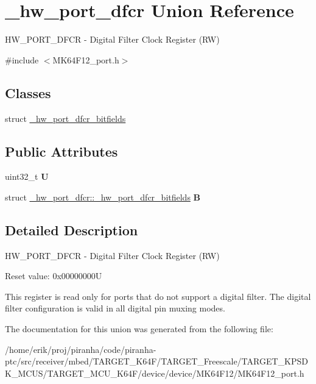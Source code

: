 \hypertarget{union__hw__port__dfcr}{}\section{\+\_\+hw\+\_\+port\+\_\+dfcr Union Reference}
\label{union__hw__port__dfcr}


H\+W\+\_\+\+P\+O\+R\+T\+\_\+\+D\+F\+CR -\/ Digital Filter Clock Register (RW)  




{\ttfamily \#include $<$M\+K64\+F12\+\_\+port.\+h$>$}

\subsection*{Classes}
\begin{DoxyCompactItemize}
\item 
struct \hyperlink{struct__hw__port__dfcr_1_1__hw__port__dfcr__bitfields}{\+\_\+hw\+\_\+port\+\_\+dfcr\+\_\+bitfields}
\end{DoxyCompactItemize}
\subsection*{Public Attributes}
\begin{DoxyCompactItemize}
\item 
uint32\+\_\+t {\bfseries U}\hypertarget{union__hw__port__dfcr_a2d9b0ab12865358a2566cd30022cb368}{}\label{union__hw__port__dfcr_a2d9b0ab12865358a2566cd30022cb368}

\item 
struct \hyperlink{struct__hw__port__dfcr_1_1__hw__port__dfcr__bitfields}{\+\_\+hw\+\_\+port\+\_\+dfcr\+::\+\_\+hw\+\_\+port\+\_\+dfcr\+\_\+bitfields} {\bfseries B}\hypertarget{union__hw__port__dfcr_a43fa443ae8b782454feb95a433ec9b2f}{}\label{union__hw__port__dfcr_a43fa443ae8b782454feb95a433ec9b2f}

\end{DoxyCompactItemize}


\subsection{Detailed Description}
H\+W\+\_\+\+P\+O\+R\+T\+\_\+\+D\+F\+CR -\/ Digital Filter Clock Register (RW) 

Reset value\+: 0x00000000U

This register is read only for ports that do not support a digital filter. The digital filter configuration is valid in all digital pin muxing modes. 

The documentation for this union was generated from the following file\+:\begin{DoxyCompactItemize}
\item 
/home/erik/proj/piranha/code/piranha-\/ptc/src/receiver/mbed/\+T\+A\+R\+G\+E\+T\+\_\+\+K64\+F/\+T\+A\+R\+G\+E\+T\+\_\+\+Freescale/\+T\+A\+R\+G\+E\+T\+\_\+\+K\+P\+S\+D\+K\+\_\+\+M\+C\+U\+S/\+T\+A\+R\+G\+E\+T\+\_\+\+M\+C\+U\+\_\+\+K64\+F/device/device/\+M\+K64\+F12/M\+K64\+F12\+\_\+port.\+h\end{DoxyCompactItemize}
